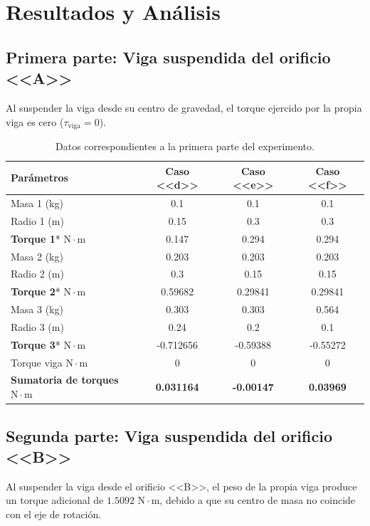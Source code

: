 \chapter{Resultados y Análisis}

\section{Primera parte: Viga suspendida del orificio <<A>>}
Al suspender la viga desde su centro de gravedad, el torque ejercido por la propia viga es cero ($\tau_{\text{viga}} = 0$).

\begin{table}[H]
\centering
\begin{tabular}{lccc}
\toprule
\textbf{Parámetros} & \textbf{Caso <<d>>} & \textbf{Caso <<e>>} & \textbf{Caso <<f>>} \\
\midrule
Masa 1 (kg) & 0.1 & 0.1 & 0.1 \\
Radio 1 (m) & 0.15 & 0.3 & 0.3 \\
\textbf{Torque 1}* $\mathrm{N\cdot m}$ & 0.147 & 0.294 & 0.294 \\
\midrule
Masa 2 (kg) & 0.203 & 0.203 & 0.203 \\
Radio 2 (m) & 0.3 & 0.15 & 0.15 \\
\textbf{Torque 2}* $\mathrm{N\cdot m}$ & 0.59682 & 0.29841 & 0.29841 \\
\midrule
Masa 3 (kg) & 0.303 & 0.303 & 0.564 \\
Radio 3 (m) & 0.24 & 0.2 & 0.1 \\
\textbf{Torque 3}* $\mathrm{N\cdot m}$ & -0.712656 & -0.59388 & -0.55272 \\
\midrule
Torque viga $\mathrm{N\cdot m}$ & 0 & 0 & 0 \\
\textbf{Sumatoria de torques} $\mathrm{N\cdot m}$ & \textbf{0.031164} & \textbf{-0.00147} & \textbf{0.03969} \\
\bottomrule
\end{tabular}
\caption{Datos correspondientes a la primera parte del experimento.}
\end{table}

\newpage

\section{Segunda parte: Viga suspendida del orificio <<B>>}
Al suspender la viga desde el orificio <<B>>, el peso de la propia viga produce un torque adicional de $1.5092$ $\mathrm{N\cdot m}$, debido a que su centro de masa no coincide con el eje de rotación.

